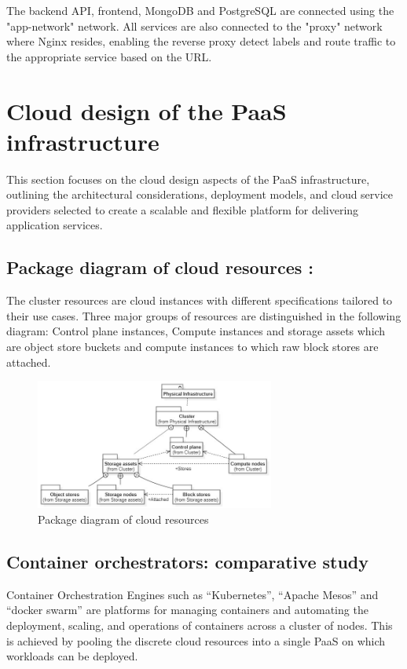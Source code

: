 \hspace{7mm}The backend API, frontend, MongoDB and PostgreSQL are connected using the "app-network" network. All services are also connected to the "proxy" network where Nginx resides, enabling the reverse proxy detect labels and route traffic to the appropriate service based on the URL.

\newpage

\section{Cloud design of the PaaS infrastructure}

\hspace{7mm}This section focuses on the cloud design aspects of the PaaS infrastructure, outlining the architectural considerations, deployment models, and cloud service providers selected to create a scalable and flexible platform for delivering application services.

\subsection{Package diagram of cloud resources :}

\hspace{7mm}The cluster resources are cloud instances with different specifications tailored to their use cases. Three major groups of resources are distinguished in the following diagram: Control plane instances, Compute instances and storage assets which are object store buckets and compute instances to which raw block stores are attached.

\begin{figure}[H]\centering
\includegraphics[width=0.7\textwidth,angle=00]{assets/f11.jpg}
\caption{Package diagram of cloud resources }
\label{fig:Package diagram of cloud resources }
\end{figure}

\subsection{Container orchestrators: comparative study}
\hspace{7mm}Container Orchestration Engines such as “Kubernetes”, “Apache Mesos” and “docker swarm” are platforms for managing containers and automating the deployment, scaling, and operations of containers across a cluster of nodes. This is achieved by pooling the discrete cloud resources into a single PaaS on which workloads can be deployed. 

